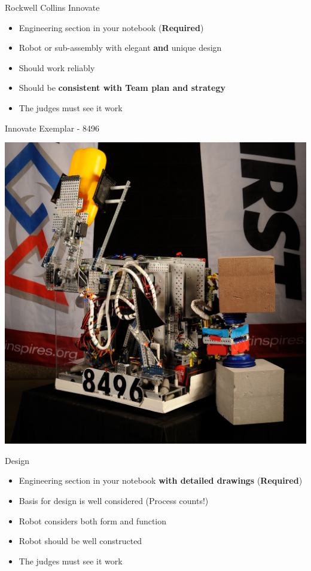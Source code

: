 \documentclass{beamer}
\begin{document}
  \begin{frame}{Rockwell Collins Innovate}
    \begin{itemize}
    \item Engineering section in your notebook (\textbf{Required})\pause
    \item Robot or sub-assembly with elegant \textbf{and} unique design \pause
    \item Should work reliably \pause
    \item Should be \textbf{consistent with Team plan and strategy} \pause
    \item The judges must see it work
    \end{itemize}
  \end{frame}

  \begin{frame}{Innovate Exemplar - 8496}
    \begin{center}
      \includegraphics[width=.7\textwidth]{8496_innovate}
    \end{center}
  \end{frame}

  \begin{frame}{Design}
    \begin{itemize}
    \item Engineering section in your notebook \textbf{with detailed drawings}  (\textbf{Required})\pause
    \item Basis for design is well considered (Process counts!) \pause
    \item Robot considers both form and function \pause
    \item Robot should be well constructed \pause
    \item The judges must see it work
    \end{itemize}
  \end{frame}
\end{document}
